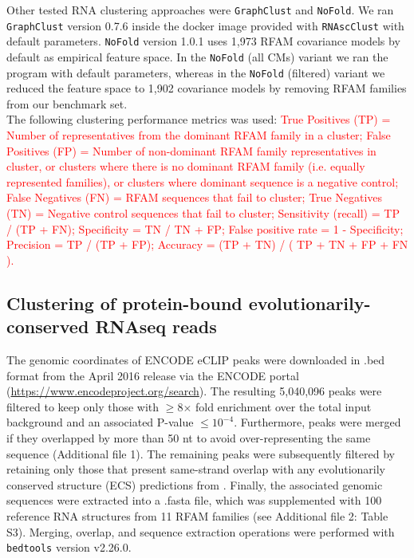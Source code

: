 \documentclass{bmcart}
\newcommand\graphclust{\texttt{GraphClust}}
\newcommand\nofold{\texttt{NoFold}}
\begin{document}
Other tested RNA clustering approaches were \graphclust{} and \nofold. We ran \graphclust{} version 0.7.6 inside the docker image provided with \texttt{RNAscClust} with default parameters. \nofold{} version 1.0.1 uses 1,973 RFAM covariance models by default as empirical feature space. In the \nofold{} (all CMs) variant we ran the program with default parameters, whereas in the \nofold{} (filtered) variant we reduced the feature space to 1,902 covariance models by removing RFAM families from our benchmark set. \\ 

The following clustering performance metrics was used:
\textcolor{red}{
True Positives (TP) = Number of representatives from the dominant RFAM family in a cluster;
False Positives (FP) = Number of non-dominant RFAM family representatives in cluster, or clusters
where there is no dominant RFAM family (i.e. equally represented families), or clusters where dominant sequence is a negative control;
False Negatives (FN) = RFAM sequences that fail to cluster; 
True Negatives (TN) = Negative control sequences that fail to cluster; 
Sensitivity (recall) = TP  / (TP + FN);
Specificity  = TN / TN + FP;
False positive rate =  1 - Specificity;
Precision = TP / (TP + FP);
Accuracy = (TP + TN) / ( TP + TN + FP + FN ). 
}

\subsection*{Clustering of protein-bound evolutionarily-conserved RNAseq reads}

The genomic coordinates of ENCODE eCLIP peaks were downloaded in .bed format from the April 2016 release via the ENCODE portal (\url{https://www.encodeproject.org/search}). The resulting 5,040,096 peaks 
were filtered to keep only those with $\ge$8$\times$ fold enrichment over the total input background and an associated P-value  $\leq10^{-4}$. Furthermore, peaks were merged if they overlapped by more than 50 nt to avoid over-representing the same sequence (Additional file 1). The remaining peaks were subsequently filtered by 
retaining only those that present same-strand overlap with any evolutionarily conserved structure (ECS) predictions from \cite{smith2013widespread}. Finally, the associated genomic sequences were extracted into a .fasta file, which was supplemented with 100 reference RNA structures from 11 RFAM families (see Additional file 2: Table S3). 
Merging, overlap, and sequence extraction operations were performed with \texttt{bedtools} version v2.26.0. \\
\end{document}
